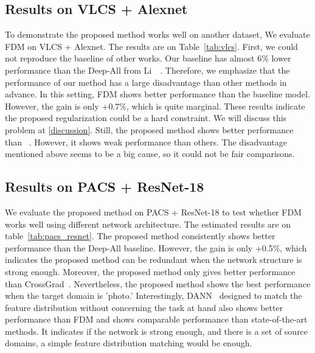 \subsection{Results on VLCS + Alexnet}
To demonstrate the proposed method works well on another dataset, We evaluate FDM on VLCS + Alexnet. The results are on Table~\ref{tab:vlcs}. First, we could not reproduce the baseline of other works. Our baseline has almost 6\% lower performance than the Deep-All from Li~\etal~\cite{li2019episodic}. Therefore, we emphasize that the performance of our method has a large disadvantage than other methods in advance.  In this setting, FDM shows better performance than the baseline model. However, the gain is only +0.7\%, which is quite marginal. These results indicate the proposed regularization could be a hard constraint. We will discuss this problem at \ref{discussion}. Still, the proposed method shows better performance than ~\cite{lresvm, muandet2013domaingeneralization}. However, it shows weak performance than others. The disadvantage mentioned above seems to be a big cause, so it could not be fair comparisons.

\subsection{Results on PACS + ResNet-18}
We evaluate the proposed method on PACS + ResNet-18 to test whether FDM works well using different network architecture. The estimated results are on table~\ref{tab:pacs_resnet}. The proposed method consistently shows better performance than the Deep-All baseline. However, the gain is only +0.5\%, which indicates the proposed method can be redundant when the network structure is strong enough. Moreover, the proposed method only gives better performance than CrossGrad~\cite{shankar2018generalizing}. Nevertheless, the proposed method shows the best performance when the target domain is 'photo.' Interestingly, DANN~\cite{ganin2016dann} designed to match the feature distribution without concerning the task at hand also shows better performance than FDM and shows comparable performance than state-of-the-art methods. It indicates if the network is strong enough, and there is a set of source domains, a simple feature distribution matching would be enough. 

